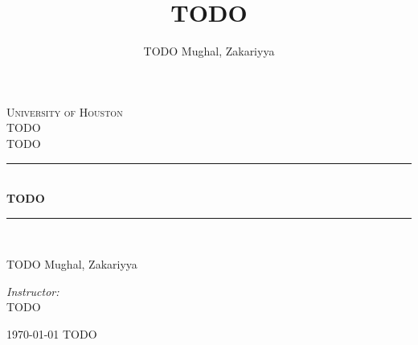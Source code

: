 \documentclass[12pt]{article}
\title{TODO}
\author{%
TODO Mughal, Zakariyya
}
\date{}
\newcommand{\HRule}{\rule{\linewidth}{0.5mm}}
\begin{document}
\begin{titlepage}
\begin{center}
\textsc{\LARGE University of Houston} \\[1.5cm]

\textsc{\Large TODO\\%
 TODO} \\[0.5cm]

\HRule \\[0.4cm]
{\huge \bfseries TODO} \\[0.4cm]
\HRule \\[1.5cm]

\begin{flushleft} \large
TODO
Mughal, Zakariyya
\end{flushleft}
\begin{flushright} \large
\emph{Instructor:} \\
TODO
\end{flushright}

\vfill

{\large \today{} TODO}
\end{center}
\end{titlepage}

%

%
%
\end{document}
